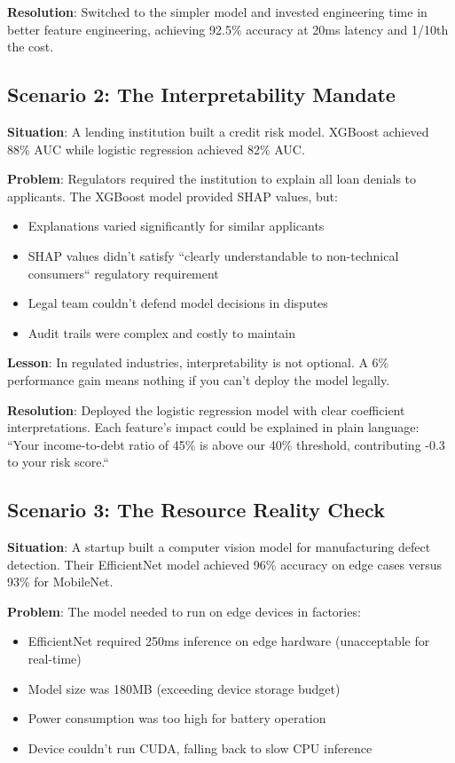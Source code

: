 \textbf{Resolution}: Switched to the simpler model and invested engineering time in better feature engineering, achieving 92.5\% accuracy at 20ms latency and 1/10th the cost.

\subsection{Scenario 2: The Interpretability Mandate}

\textbf{Situation}: A lending institution built a credit risk model. XGBoost achieved 88\% AUC while logistic regression achieved 82\% AUC.

\textbf{Problem}: Regulators required the institution to explain all loan denials to applicants. The XGBoost model provided SHAP values, but:
\begin{itemize}
    \item Explanations varied significantly for similar applicants
    \item SHAP values didn't satisfy ``clearly understandable to non-technical consumers`` regulatory requirement
    \item Legal team couldn't defend model decisions in disputes
    \item Audit trails were complex and costly to maintain
\end{itemize}

\textbf{Lesson}: In regulated industries, interpretability is not optional. A 6\% performance gain means nothing if you can't deploy the model legally.

\textbf{Resolution}: Deployed the logistic regression model with clear coefficient interpretations. Each feature's impact could be explained in plain language: ``Your income-to-debt ratio of 45\% is above our 40\% threshold, contributing -0.3 to your risk score.``

\subsection{Scenario 3: The Resource Reality Check}

\textbf{Situation}: A startup built a computer vision model for manufacturing defect detection. Their EfficientNet model achieved 96\% accuracy on edge cases versus 93\% for MobileNet.

\textbf{Problem}: The model needed to run on edge devices in factories:
\begin{itemize}
    \item EfficientNet required 250ms inference on edge hardware (unacceptable for real-time)
    \item Model size was 180MB (exceeding device storage budget)
    \item Power consumption was too high for battery operation
    \item Device couldn't run CUDA, falling back to slow CPU inference
\end{itemize}

